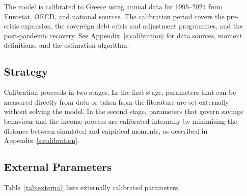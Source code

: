 The model is calibrated to Greece using annual data for 1995--2024 from Eurostat, OECD, and national sources. The calibration period covers the pre-crisis expansion, the sovereign debt crisis and adjustment programmes, and the post-pandemic recovery. See Appendix~\ref{s:calibration} for data sources, moment definitions, and the estimation algorithm.

\subsection{Strategy}

Calibration proceeds in two stages. In the first stage, parameters that can be measured directly from data or taken from the literature are set externally without solving the model. In the second stage, parameters that govern savings behaviour and the income process are calibrated internally by minimising the distance between simulated and empirical moments, as described in Appendix~\ref{s:calibration}.

\subsection{External Parameters}

Table~\ref{tab:external} lists externally calibrated parameters.

